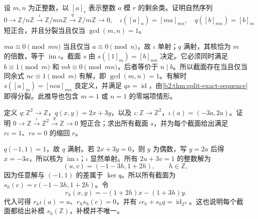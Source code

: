 \begin{exercise}\label{b2:ex:03-cyclic-extension-splitting}
	设 \(m,n\) 为正整数，以 \([a]_r\) 表示整数 \(a\) 模 \(r\) 的剩余类。证明自然序列
	\[
		0\longrightarrow\mathbb Z/n\mathbb Z\xrightarrow{\iota} \mathbb Z/mn\mathbb Z\xrightarrow{q}\mathbb Z/m\mathbb Z\longrightarrow0, \quad\iota([a]_n)=[ma]_{mn},\quad q([b]_{mn})=[b]_m
	\]
	短正合，并且分裂当且仅当 \(\gcd(m,n)=1\)。
\end{exercise}
\begin{solution}
	\(ma\equiv0\pmod{mn}\) 当且仅当 \(a\equiv0\pmod n\)，故 \(\iota\) 单射；\(q\) 满射，其核恰为 \(m\) 的倍数，等于 \(\operatorname{im}\iota\)。截面 \(s\) 由 \(s([1]_m)=[b]_{mn}\) 决定。它必须同时满足 \(b\equiv1\pmod m\) 和 \(mb\equiv0\pmod{mn}\)，后者等价于 \(n\mid b\)。所以截面存在当且仅当同余式 \(nc\equiv1\pmod m\) 有解，即 \(\gcd(m,n)=1\)。有解时 \(s([a]_m)=[nca]_{mn}\) 良定义，并满足 \(qs=\operatorname{id}\)，由\cref{b2:thm:split-exact-sequence}即得分裂。此推导也包含 \(m=1\) 或 \(n=1\) 的零端项情形。
\end{solution}

\begin{exercise}\label{b2:ex:03-all-sections}
	定义 \(q:\mathbb Z^2\to\mathbb Z\)，\(q(x,y)=2x+3y\)，以及 \(\iota:\mathbb Z\to\mathbb Z^2\)，\(\iota(a)=(-3a,2a)\)。证明 \(0\to\mathbb Z\xrightarrow{\iota}\mathbb Z^2\xrightarrow{q}\mathbb Z\to0\) 短正合；求出所有截面 \(s\)，并为每个截面给出满足 \(r\iota=1\)、\(rs=0\) 的缩回 \(r\)。
\end{exercise}
\begin{solution}
	\(q(-1,1)=1\)，故 \(q\) 满射。若 \(2x+3y=0\)，则 \(y\) 为偶数，写 \(y=2a\) 后得 \(x=-3a\)，所以核为 \(\operatorname{im}\iota\)；\(\iota\) 显然单射。所有 \(2u+3v=1\) 的整数解为
	\[
		(u,v)=(-1-3h,1+2h),\qquad h\in\mathbb Z,
	\]
	因为任意解与 \((-1,1)\) 的差属于 \(\ker q\)。所以所有截面为 \(s_h(c)=c(-1-3h,1+2h)\)。令
	\[
		r_h(x,y)=-(1+2h)x-(1+3h)y.
	\]
	代入可得 \(r_h\iota(a)=a\)、\(r_hs_h(c)=0\)，并有 \(\iota r_h+s_hq=\operatorname{id}_{\mathbb Z^2}\)。这也说明每个截面都给出补模 \(s_h(\mathbb Z)\)，补模并不唯一。
\end{solution}

